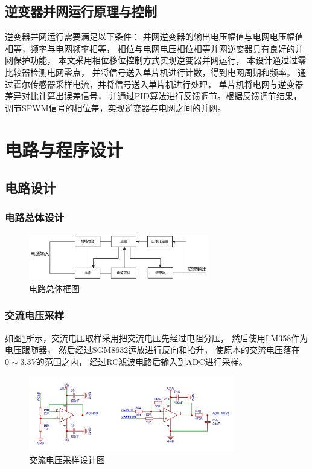 \documentclass[a4paper,12pt]{article}
\begin{document}
\subsection{逆变器并网运行原理与控制}
逆变器并网运行需要满足以下条件：
并网逆变器的输出电压幅值与电网电压幅值相等，频率与电网频率相等，
相位与电网电压相位相等并网逆变器具有良好的并网保护功能，
本文采用相位移位控制方式实现逆变器并网运行，
本设计通过过零比较器检测电网零点，
并将信号送入单片机进行计数，得到电网周期和频率。
通过霍尔传感器采样电流，并将信号送入单片机进行处理，
单片机将电网与逆变器差异对比计算出误差信号，
并通过PID算法进行反馈调节。根据反馈调节结果，
调节SPWM信号的相位差，实现逆变器与电网之间的并网。


\section{电路与程序设计}
\subsection{电路设计}

\subsubsection{电路总体设计}
\begin{figure}[h]
\centering
\includegraphics[width=0.7\textwidth]{src/fig4.png}
\caption{电路总体框图}
\end{figure}

\subsubsection{交流电压采样}
如图\ref{fig5}所示，交流电压取样采用把交流电压先经过电阻分压，
然后使用LM358作为电压跟随器，
然后经过SGM8632运放进行反向和抬升，
使原本的交流电压落在$0\sim 3.3V$的范围之内，
经过RC滤波电路后输入到ADC进行采样。
\begin{figure}[h]
\centering
\includegraphics[width=0.8\textwidth]{src/fig5.png}
\caption{交流电压采样设计图}
\label{fig5}
\end{figure}
\end{document}
